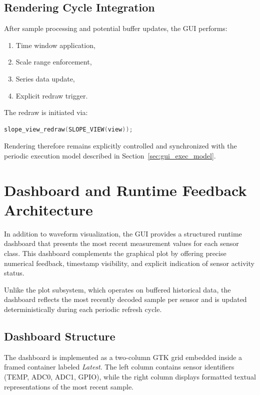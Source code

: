 \subsection{Rendering Cycle Integration}
\label{sec:gui_render_cycle}

After sample processing and potential buffer updates, the GUI performs:

\begin{enumerate}
	\item Time window application,
	\item Scale range enforcement,
	\item Series data update,
	\item Explicit redraw trigger.
\end{enumerate}

The redraw is initiated via:

\begin{lstlisting}[language=C]
	slope_view_redraw(SLOPE_VIEW(view));
\end{lstlisting}

Rendering therefore remains explicitly controlled and synchronized with the periodic execution model described in Section~\ref{sec:gui_exec_model}.

\section{Dashboard and Runtime Feedback Architecture}
\label{sec:gui_dashboard}

In addition to waveform visualization, the GUI provides a structured runtime dashboard that presents the most recent measurement values for each sensor class. This dashboard complements the graphical plot by offering precise numerical feedback, timestamp visibility, and explicit indication of sensor activity status.

Unlike the plot subsystem, which operates on buffered historical data, the dashboard reflects the most recently decoded sample per sensor and is updated deterministically during each periodic refresh cycle.

\subsection{Dashboard Structure}
\label{sec:gui_dashboard_structure}

The dashboard is implemented as a two-column GTK grid embedded inside a framed container labeled \emph{Latest}. The left column contains sensor identifiers (TEMP, ADC0, ADC1, GPIO), while the right column displays formatted textual representations of the most recent sample.

